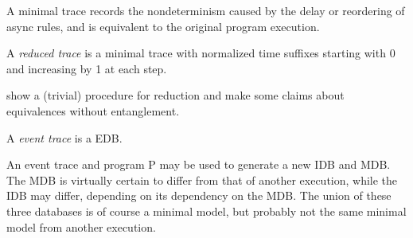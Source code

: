 A minimal trace records the nondeterminism caused by the delay or reordering of async rules, and
is equivalent to the original program execution.  

\begin{definition}
A \emph{reduced trace} is a minimal trace with normalized time suffixes starting with 0 and increasing by 1 at each step.
\end{definition}

show a (trivial) procedure for reduction and make some claims about equivalences without entanglement.

\begin{definition}
A \emph{event trace} is a \lang EDB.
\end{definition}

An event trace and program P may be used to generate a new IDB and MDB.  The MDB is virtually certain to differ from that of another
execution, while the IDB may differ, depending on its dependency on the MDB.  The union of these three databases is of course a
minimal model, but probably not the same minimal model from another execution.  





